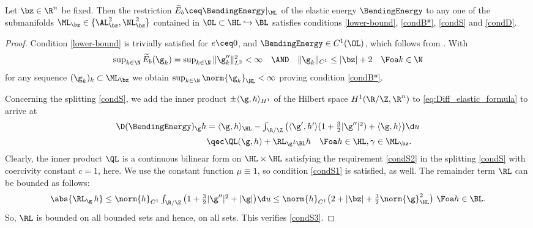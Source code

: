 \begin{theorem}
\label{thm:PS_elastic}
Let $\bz\in\R^n$ be fixed. Then 
the restriction $\widetilde{E}_b\ceq\BendingEnergy|_{\ML}$ of the elastic energy $\BendingEnergy$ 
to any one of the submanifolds $\ML_{\bz}\in\{\AL^2_\bz,\NL^2_\bz\}$ contained in $\OL\subset\HL\hookrightarrow\BL$
satisfies conditions \ref{lower-bound}, \ref{condB*},
\ref{condS} and \ref{condD}. 
\end{theorem}
\begin{proof}
Condition \ref{lower-bound} is trivially satisfied for $e\ceq0$, and $\BendingEnergy\in C^1(\OL)$, which follows from \cite[Proposition 4.8]{okabe-schrader_2023}.
With 
$$\textstyle
\sup_{k\in\N}\widetilde{E}_b(\g_k)=\sup_{k\in\N}\|\g_k''\|_{L^2}^2<\infty
\quad\AND\quad\|\g_k\|_{C^1}\le |\bz|+2\quad\Foa k\in\N
$$ 
for any sequence
$(\g_k)_k\subset\ML_{\bz}$
we obtain $\sup_{k\in\N}
\norm{\g_k}_\HL<\infty$ proving condition \ref{condB*}.

Concerning the splitting \ref{condS}, we add the inner product
$\pm\langle\g,h\rangle_{H^1}$ of the Hilbert space $H^1(\R/\Z,\R^n)$
to \cref{eq:Diff_elastic_formula}
to arrive at
\begin{align}\label{eq:elastic-splitting}
        \D(\BendingEnergy)_\g h&\textstyle
        =
        \langle\g,h\rangle_{\HL} - \int_{\R/\Z}\big(\langle\g',h'\rangle
        (1+\frac{3}{2}|\g''|^2) +\langle\g,h\rangle\big) \d u
        \notag\\
        &\qec  \textstyle
        \QL(\g,h)+\RL_\g \iota_{\BL}h \quad\Foa h\in\HL,\gamma\in \ML_{\bz}.
\end{align}
Clearly,  the inner product $\QL$ is a continuous bilinear form on
$\HL\times\HL$ satisfying the requirement \ref{condS2} in
the splitting \ref{condS} with coercivity
constant $c=1$, here. We use the constant function $\mu \equiv 1$, so condition \ref{condS1} is satisfied, as well. The remainder term $\RL$ can be bounded as follows:
\begin{equation}
    \label{eq:remainder-estimate}
    \abs{ \RL_\g \, h } 
    \le\textstyle
    \norm{h}_{C^1}\int_{\R/\Z}\big(1+\frac{3}{2}|\g''|^2+|\g|\big)\d u\le
    \norm{h}_{C^1}\big(2+|\bz|+\frac{3}{2} \norm{\g}^2_\HL\big)\,\,\Foa h\in \BL.
\end{equation}
So, $\RL$ is bounded on all bounded sets and hence, on all \Econtrolled{\BendingEnergy} sets. 
This verifies \ref{condS3}.


\end{proof}
